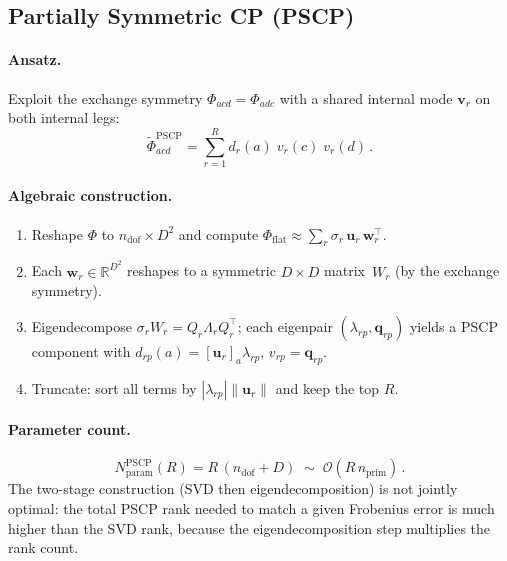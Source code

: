 \documentclass[11pt]{article}
\newcommand{\vc}[1]{\bm{#1}}
\newcommand{\ndof}{n_{\mathrm{dof}}}
\newcommand{\nprim}{n_{\mathrm{prim}}}
\newcommand{\cO}{\mathcal{O}}
\begin{document}
\subsection{Partially Symmetric CP (PSCP)}
\label{sec:pscp}

\paragraph{Ansatz.}
Exploit the exchange symmetry $\Phi_{acd} = \Phi_{adc}$ with a
shared internal mode $\vc{v}_r$ on both internal legs:
\begin{equation}\label{eq:pscp}
  \boxed{
    \tilde\Phi_{acd}^{\mathrm{PSCP}}
    = \sum_{r=1}^{R} d_r(a)\; v_r(c)\; v_r(d)\,.
  }
\end{equation}

\paragraph{Algebraic construction.}
\begin{enumerate}
  \item Reshape $\Phi$ to $\ndof \times D^2$ and compute
        $\Phi_{\mathrm{flat}} \approx
        \sum_r \sigma_r\, \vc{u}_r\, \vc{w}_r^\top$.
  \item Each $\vc{w}_r \in \mathbb{R}^{D^2}$ reshapes to a symmetric
        $D \times D$ matrix~$W_r$ (by the exchange symmetry).
  \item Eigendecompose $\sigma_r W_r = Q_r \Lambda_r Q_r^\top$;
        each eigenpair $(\lambda_{rp}, \vc{q}_{rp})$ yields a PSCP
        component with
        $d_{rp}(a) = [\vc{u}_r]_a \lambda_{rp}$,\;
        $v_{rp} = \vc{q}_{rp}$.
  \item Truncate: sort all terms by $|\lambda_{rp}| \|\vc{u}_r\|$
        and keep the top $R$.
\end{enumerate}

\paragraph{Parameter count.}
\begin{equation}\label{eq:pscp-params}
  N_{\mathrm{param}}^{\mathrm{PSCP}}(R) = R\,(\ndof + D)
  \;\sim\; \cO(R\,\nprim)\,.
\end{equation}
The two-stage construction (SVD then eigendecomposition) is not jointly
optimal: the total PSCP rank needed to match a given Frobenius error is
much higher than the SVD rank, because the eigendecomposition step
multiplies the rank count.
\end{document}
